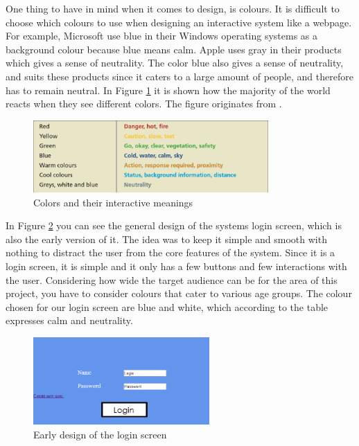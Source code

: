 One thing to have in mind when it comes to design, is colours. It is difficult to choose which colours to use when designing an interactive system like a webpage. For example, Microsoft use blue in their Windows operating systems as a background colour because blue means calm. Apple uses gray in their products which gives a sense of neutrality. The color blue also gives a sense of neutrality, and suits these products since it caters to a large amount of people, and therefore has to remain neutral. In Figure \ref{Colors} it is shown how the majority of the world reacts when they see different colors. The figure originates from \cite{DEBBook}.

\begin{figure}[htb]
\centering
\includegraphics[width=0.8\textwidth]{Images/Colors.png}
\caption{Colors and their interactive meanings \cite{DEBBook}}
\label{Colors}
\end{figure}

In Figure \ref{Login} you can see the general design of the systems login screen, which is also the early version of it. The idea was to keep it simple and smooth with nothing to distract the user from the core features of the system. Since it is a login screen, it is simple and it only has a few buttons and few interactions with the user. Considering how wide the target audience can be for the area of this project, you have to consider colours that cater to various age groups. The colour chosen for our login screen are blue and white, which according to the table expresses calm and neutrality.

\begin{figure}[htb]
\centering
\includegraphics[width=0.6\textwidth]{Images/Login.png}
\caption{Early design of the login screen}
\label{Login}
\end{figure}

